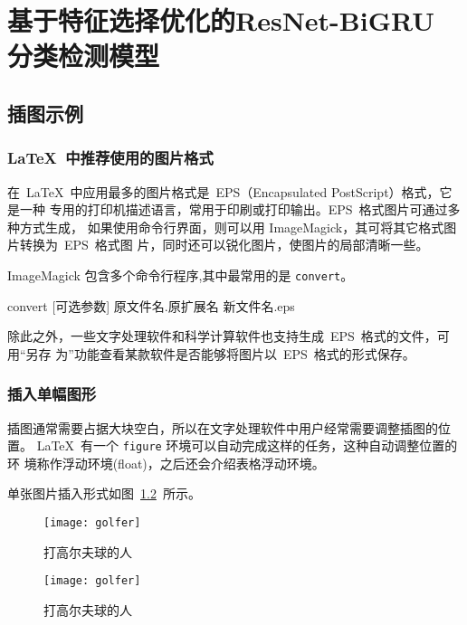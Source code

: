 \chapter{基于特征选择优化的ResNet-BiGRU 分类检测模型}
\label{cha:ResNet-BiGRU}

\section{插图示例}
\label{sec:figure}

\subsection{\LaTeX~中推荐使用的图片格式}

在~\LaTeX~中应用最多的图片格式是~EPS（Encapsulated PostScript）格式，它是一种
专用的打印机描述语言，常用于印刷或打印输出。EPS~格式图片可通过多种方式生成，
如果使用命令行界面，则可以用 ImageMagick，其可将其它格式图片转换为~EPS~格式图
片，同时还可以锐化图片，使图片的局部清晰一些。

ImageMagick 包含多个命令行程序,其中最常用的是 \texttt{convert}。
\begin{shell}
convert [可选参数] 原文件名.原扩展名 新文件名.eps
\end{shell}

除此之外，一些文字处理软件和科学计算软件也支持生成~EPS~格式的文件，可用“另存
为”功能查看某款软件是否能够将图片以~EPS~格式的形式保存。

\subsection{插入单幅图形}

插图通常需要占据大块空白，所以在文字处理软件中用户经常需要调整插图的位置。
\LaTeX~有一个 \texttt{figure} 环境可以自动完成这样的任务，这种自动调整位置的环
境称作浮动环境(float)，之后还会介绍表格浮动环境。

单张图片插入形式如图~\ref{fig:golfer}~所示。
\begin{figure}[htbp]
\centering
\texttt{[image: golfer]}
\caption{打高尔夫球的人}
\label{fig:golfer}
\end{figure}

\begin{latex}
\begin{figure}[htbp]
\centering
\texttt{[image: golfer]}
\caption{打高尔夫球的人}
\label{fig:golfer}%
\end{figure}
\end{latex}

